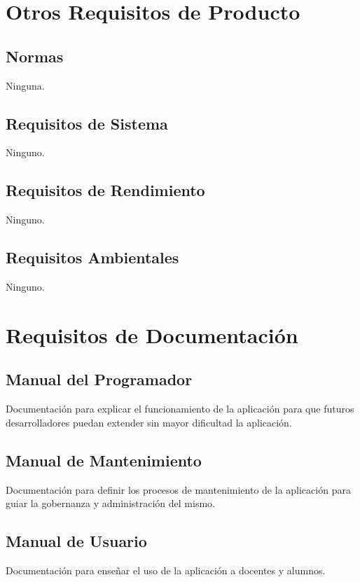 \section{Otros Requisitos de Producto}
\subsection{Normas}
Ninguna.
\subsection{Requisitos de Sistema}
Ninguno.
\subsection{Requisitos de Rendimiento}
Ninguno.
\subsection{Requisitos Ambientales}
Ninguno.
\section{Requisitos de Documentación}
\subsection{Manual del Programador}
Documentación para explicar el funcionamiento de la aplicación para que futuros desarrolladores puedan extender sin mayor dificultad la aplicación.
\subsection{Manual de Mantenimiento}
Documentación para definir los procesos de mantenimiento de la aplicación para guiar la gobernanza y administración del mismo.
\subsection{Manual de Usuario}
Documentación para enseñar el uso de la aplicación a docentes y alumnos.

